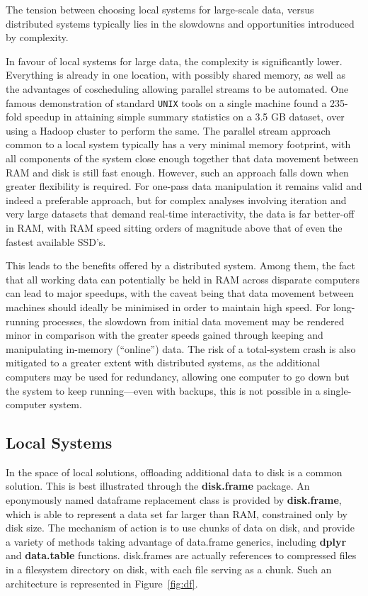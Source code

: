 The tension between choosing local systems for large-scale data, versus distributed systems typically lies in the slowdowns and opportunities introduced by complexity.

In favour of local systems for large data, the complexity is significantly lower.
Everything is already in one location, with possibly shared memory, as well as the advantages of coscheduling allowing parallel streams to be automated.
One famous demonstration of standard \texttt{UNIX} tools on a single machine found a 235-fold speedup in attaining simple summary statistics on a 3.5 GB dataset, over using a Hadoop cluster to perform the same\cite{drake2014cltvscluster}.
The parallel stream approach common to a local system typically has a very minimal memory footprint, with all components of the system close enough together that data movement between RAM and disk is still fast enough.
However, such an approach falls down when greater flexibility is required.
For one-pass data manipulation it remains valid and indeed a preferable approach, but for complex analyses involving iteration and very large datasets that demand real-time interactivity, the data is far better-off in RAM, with RAM speed sitting orders of magnitude above that of even the fastest available SSD's\cite{kim201923}\cite{samsung2020SSD}.

This leads to the benefits offered by a distributed system.
Among them, the fact that all working data can potentially be held in RAM across disparate computers can lead to major speedups, with the caveat being that data movement between machines should ideally be minimised in order to maintain high speed.
For long-running processes, the slowdown from initial data movement may be rendered minor in comparison with the greater speeds gained through keeping and manipulating in-memory (``online'') data\cite{emmerich2000engineering}.
The risk of a total-system crash is also mitigated to a greater extent with distributed systems, as the additional computers may be used for redundancy, allowing one computer to go down but the system to keep running---even with backups, this is not possible in a single-computer system.

\subsection{Local Systems}

In the space of local solutions, offloading additional data to disk is a common solution.
This is best illustrated through the \textbf{disk.frame} package\cite{zj20}.
An eponymously named dataframe replacement class is provided by \textbf{disk.frame}, which is able to represent a data  set far larger than RAM, constrained only by disk size.
The mechanism of action is to use chunks of data on disk, and provide a variety of methods taking advantage of data.frame generics, including \textbf{dplyr} and \textbf{data.table} functions.
disk.frames are actually references to compressed files in a filesystem directory on disk, with each file serving as a chunk.
Such an architecture is represented in Figure~\ref{fig:df}.

